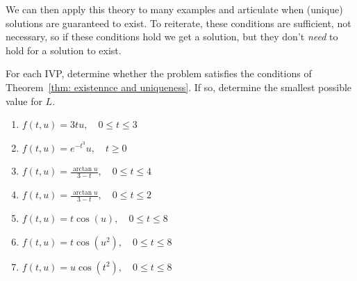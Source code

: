 \documentclass[11pt]{article}
\begin{document}
We can then apply this theory to many examples and articulate when (unique) solutions are guaranteed to exist. To reiterate, these conditions are sufficient, not necessary, so if these conditions hold we get a solution, but they don't \textit{need} to hold for a solution to exist. 

\begin{problem}
    For each IVP, determine whether the problem satisfies the conditions of Theorem~\ref{thm: existennce and uniqueness}. If so, determine the smallest possible value for $L$.
    \begin{enumerate}[1)]
        \item $f(t,u) = 3tu, \quad  0\leq t \leq 3$
        \item $f(t,u) = e^{-t^3}u, \quad t \geq 0$
        \item $f(t,u) = \frac{\arctan{u}}{3-t}, \quad  0\leq t \leq 4$
        \item $f(t,u)=\frac{\arctan{u}}{3-t}, \quad  0\leq t \leq 2$
      \item $f(t,u) = t\cos(u), \quad 0 \leq t \leq 8$
      \item $f(t,u) = t\cos(u^2), \quad 0 \leq t \leq 8$
      \item $f(t,u) = u\cos(t^2), \quad 0 \leq t \leq 8$
    \end{enumerate}
\end{problem}
\end{document}
